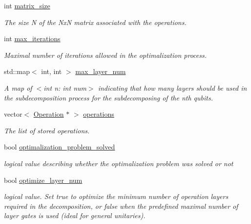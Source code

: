 \begin{DoxyCompactItemize}
int \hyperlink{class_operation_a8236c07112cb165a00d3869363808624}{matrix\+\_\+size}
\begin{DoxyCompactList}\small\item\em The size N of the NxN matrix associated with the operations. \end{DoxyCompactList}\item 
int \hyperlink{class_decomposition___base_a89e74f075626c21e23228772bf8ad395}{max\+\_\+iterations}
\begin{DoxyCompactList}\small\item\em Maximal number of iterations allowed in the optimalization process. \end{DoxyCompactList}\item 
std\+::map$<$ int, int $>$ \hyperlink{class_decomposition___base_a861d7b10226fc13f05c131e18c8be908}{max\+\_\+layer\+\_\+num}
\begin{DoxyCompactList}\small\item\em A map of $<$int n\+: int num$>$ indicating that how many layers should be used in the subdecomposition process for the subdecomposing of the nth qubits. \end{DoxyCompactList}\item 
vector$<$ \hyperlink{class_operation}{Operation} $\ast$ $>$ \hyperlink{class_operation__block_a1efec4139888e591b59acd7b84497af1}{operations}
\begin{DoxyCompactList}\small\item\em The list of stored operations. \end{DoxyCompactList}\item 
bool \hyperlink{class_decomposition___base_ae9c42d3d9cdeeae765d6e7ebc2563d34}{optimalization\+\_\+problem\+\_\+solved}
\begin{DoxyCompactList}\small\item\em logical value describing whether the optimalization problem was solved or not \end{DoxyCompactList}\item 
bool \hyperlink{class_n___qubit___decomposition_aad88308faf408e7b270b0853841a5fd0}{optimize\+\_\+layer\+\_\+num}
\begin{DoxyCompactList}\small\item\em logical value. Set true to optimize the minimum number of operation layers required in the decomposition, or false when the predefined maximal number of layer gates is used (ideal for general unitaries). \end{DoxyCompactList}\item 

\end{DoxyCompactItemize}
